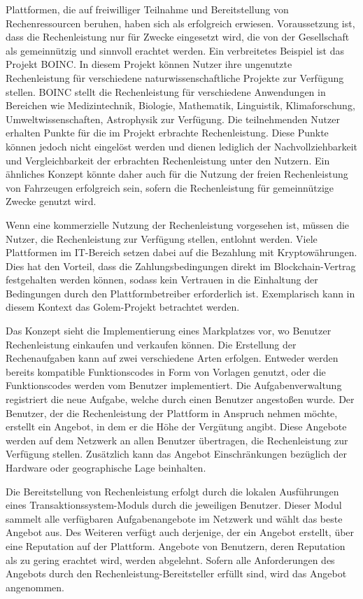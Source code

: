 Plattformen, die auf freiwilliger Teilnahme und Bereitstellung von Rechenressourcen beruhen, haben sich als erfolgreich erwiesen. Voraussetzung ist, dass die Rechenleistung nur für Zwecke eingesetzt wird, die von der Gesellschaft als gemeinnützig und sinnvoll erachtet werden. Ein verbreitetes Beispiel ist das Projekt \gls{BOINC}. In diesem Projekt können Nutzer ihre ungenutzte Rechenleistung für verschiedene naturwissenschaftliche Projekte zur Verfügung stellen.  \gls{BOINC} stellt die Rechenleistung für verschiedene Anwendungen in Bereichen wie Medizintechnik, Biologie, Mathematik, Linguistik, Klimaforschung, Umweltwissenschaften, Astrophysik zur Verfügung. Die teilnehmenden Nutzer erhalten Punkte für die im Projekt erbrachte Rechenleistung. Diese Punkte können jedoch nicht eingelöst werden und dienen lediglich der Nachvollziehbarkeit und Vergleichbarkeit der erbrachten Rechenleistung unter den Nutzern. Ein ähnliches Konzept könnte daher auch für die Nutzung der freien Rechenleistung von Fahrzeugen erfolgreich sein, sofern die Rechenleistung für gemeinnützige Zwecke genutzt wird.

Wenn eine kommerzielle Nutzung der Rechenleistung vorgesehen ist, müssen die Nutzer, die Rechenleistung zur Verfügung stellen, entlohnt werden. Viele Plattformen im IT-Bereich setzen dabei auf die Bezahlung mit Kryptowährungen. Dies hat den Vorteil, dass die Zahlungsbedingungen direkt im Blockchain-Vertrag festgehalten werden können, sodass kein Vertrauen in die Einhaltung der Bedingungen durch den Plattformbetreiber erforderlich ist. Exemplarisch kann in diesem Kontext das Golem-Projekt betrachtet werden. 

Das Konzept sieht die Implementierung eines Markplatzes vor, wo Benutzer Rechenleistung einkaufen und verkaufen können. Die Erstellung der Rechenaufgaben kann auf zwei verschiedene Arten erfolgen. Entweder werden bereits kompatible Funktionscodes in Form von Vorlagen genutzt, oder die Funktionscodes werden vom Benutzer implementiert. Die Aufgabenverwaltung registriert die neue Aufgabe, welche durch einen Benutzer angestoßen wurde. Der Benutzer, der die Rechenleistung der Plattform in Anspruch nehmen möchte, erstellt ein Angebot, in dem er die Höhe der Vergütung angibt. Diese Angebote werden auf dem Netzwerk an allen Benutzer übertragen, die Rechenleistung zur Verfügung stellen. Zusätzlich kann das Angebot Einschränkungen bezüglich der Hardware oder geographische Lage beinhalten.

Die Bereitstellung von Rechenleistung erfolgt durch die lokalen Ausführungen eines Transaktionssystem-Moduls durch die jeweiligen Benutzer. Dieser Modul sammelt alle verfügbaren Aufgabenangebote im Netzwerk und wählt das beste Angebot aus. Des Weiteren verfügt auch derjenige, der ein Angebot erstellt, über eine Reputation auf der Plattform. Angebote von Benutzern, deren Reputation als zu gering erachtet wird, werden abgelehnt. Sofern alle Anforderungen des Angebots durch den Rechenleistung-Bereitsteller erfüllt sind, wird das Angebot angenommen. 

